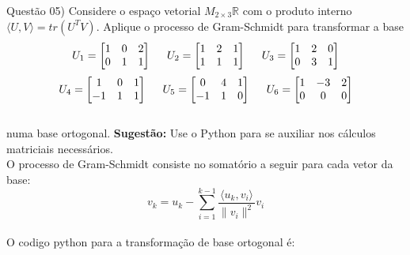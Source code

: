 
\noindent \textcolor{COLOR1}{Questão 05)} Considere o espaço vetorial $M_{2\times3}\mathbb{R}$ com o produto interno $\langle U, V\rangle= tr(U^TV)$.
Aplique o processo de Gram-Schmidt para transformar a base
\\

\[
    U_1 = \begin{bmatrix}
        1 & 0 & 2 \\
        0 & 1 & 1
    \end{bmatrix}\hspace{0.5cm}
    U_2 = \begin{bmatrix}
        1 & 2 & 1 \\
        1 & 1 & 1
    \end{bmatrix}\hspace{0.5cm}
    U_3 = \begin{bmatrix}
        1 & 2 & 0 \\
        0 & 3 & 1
    \end{bmatrix}
\]
\[
    U_4 = \begin{bmatrix}
        1  & 0 & 1 \\
        -1 & 1 & 1
    \end{bmatrix}\hspace{0.5cm}
    U_5 = \begin{bmatrix}
        0  & 4 & 1 \\
        -1 & 1 & 0
    \end{bmatrix}\hspace{0.5cm}
    U_6 = \begin{bmatrix}
        1 & -3 & 2 \\
        0 & 0  & 0
    \end{bmatrix}
\]
\\
numa base ortogonal. \textcolor{COLOR2}{\textbf{Sugestão:}} Use o Python para se auxiliar nos cálculos matriciais necessários.
\\

O processo de Gram-Schmidt consiste no somatório a seguir para cada vetor da base:
\\

\begin{equation*}
    v_k = u_k - \sum_{i=1}^{k-1} \frac{\langle u_k,v_i\rangle}{\|v_i\|^2}v_i
\end{equation*}
\\

O codigo python para a transformação de base ortogonal é:\\

